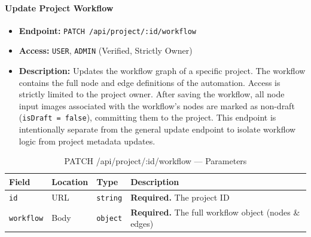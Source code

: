 \paragraph{Update Project Workflow}
\label{subsubsec:update-workflow}

\begin{itemize}
  \item \textbf{Endpoint:} \texttt{PATCH /api/project/:id/workflow}
  \item \textbf{Access:} \texttt{USER}, \texttt{ADMIN} (Verified, Strictly Owner)
  \item \textbf{Description:} Updates the workflow graph of a specific project.
  The workflow contains the full node and edge definitions of the automation. Access is strictly limited to the project owner.
  After saving the workflow, all node input images associated with the workflow's
  nodes are marked as non-draft (\texttt{isDraft = false}), committing them to
  the project.
  This endpoint is intentionally separate from the general update
  endpoint to isolate workflow logic from project metadata updates.
\end{itemize}

\begin{table}[H]
\centering
\renewcommand{\arraystretch}{1.3}
\begin{tabularx}{\textwidth}{|l|l|l|X|}
\hline
\textbf{Field} & \textbf{Location} & \textbf{Type} & \textbf{Description} \\
\hline
\texttt{id}       & URL  & \texttt{string} & \textbf{Required.} The project ID \\
\hline
\texttt{workflow} & Body & \texttt{object} & \textbf{Required.} The full workflow object (nodes \& edges) \\
\hline
\end{tabularx}
\caption{PATCH /api/project/:id/workflow — Parameters}
\label{tab:update-workflow-params}
\end{table}

